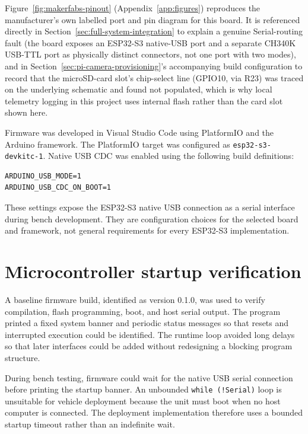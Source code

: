 Figure~\ref{fig:makerfabs-pinout} (Appendix~\ref{app:figures}) reproduces the manufacturer's own labelled port and pin diagram for this board. It is referenced directly in Section~\ref{sec:full-system-integration} to explain a genuine Serial-routing fault (the board exposes an ESP32-S3 native-USB port and a separate CH340K USB-TTL port as physically distinct connectors, not one port with two modes), and in Section~\ref{sec:pi-camera-provisioning}'s accompanying build configuration to record that the microSD-card slot's chip-select line (GPIO10, via R23) was traced on the underlying schematic and found not populated, which is why local telemetry logging in this project uses internal flash rather than the card slot shown here.


Firmware was developed in Visual Studio Code using PlatformIO and the Arduino framework. The PlatformIO target was configured as \texttt{esp32-s3-devkitc-1}. Native USB CDC was enabled using the following build definitions:

\begin{verbatim}
ARDUINO_USB_MODE=1
ARDUINO_USB_CDC_ON_BOOT=1
\end{verbatim}

These settings expose the ESP32-S3 native USB connection as a serial interface during bench development. They are configuration choices for the selected board and framework, not general requirements for every ESP32-S3 implementation.

\section{Microcontroller startup verification}

A baseline firmware build, identified as version 0.1.0, was used to verify compilation, flash programming, boot, and host serial output. The program printed a fixed system banner and periodic status messages so that resets and interrupted execution could be identified. The runtime loop avoided long delays so that later interfaces could be added without redesigning a blocking program structure.

During bench testing, firmware could wait for the native USB serial connection before printing the startup banner. An unbounded \texttt{while (!Serial)} loop is unsuitable for vehicle deployment because the unit must boot when no host computer is connected. The deployment implementation therefore uses a bounded startup timeout rather than an indefinite wait.

